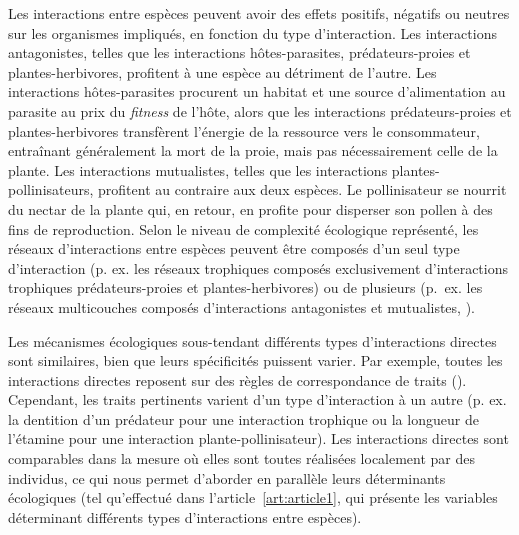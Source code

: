 Les interactions entre espèces peuvent avoir des effets positifs, négatifs ou
neutres sur les organismes impliqués, en fonction du type d'interaction. Les
interactions antagonistes, telles que les interactions hôtes-parasites,
prédateurs-proies et plantes-herbivores, profitent à une espèce au détriment de
l'autre. Les interactions hôtes-parasites procurent un habitat et une source
d'alimentation au parasite au prix du \textit{fitness} de l'hôte, alors que les
interactions prédateurs-proies et plantes-herbivores transfèrent l'énergie de la
ressource vers le consommateur, entraînant généralement la mort de la proie,
mais pas nécessairement celle de la plante. Les interactions mutualistes, telles
que les interactions plantes-pollinisateurs, profitent au contraire aux deux
espèces. Le pollinisateur se nourrit du nectar de la plante qui, en retour, en
profite pour disperser son pollen à des fins de reproduction. Selon le niveau de
complexité écologique représenté, les réseaux d'interactions entre espèces
peuvent être composés d'un seul type d'interaction (p. ex. les réseaux
trophiques composés exclusivement d'interactions trophiques prédateurs-proies et
plantes-herbivores) ou de plusieurs (p.~ex. les réseaux multicouches composés
d'interactions antagonistes et mutualistes, \cite{Pilosof2017Multilayer}). 
 
Les mécanismes écologiques sous-tendant différents types d'interactions directes
sont similaires, bien que leurs spécificités puissent varier. Par exemple,
toutes les interactions directes reposent sur des règles de correspondance de
traits (\cite{Poisot2015Species}). Cependant, les traits pertinents varient d'un
type d'interaction à un autre (p. ex. la dentition d'un prédateur pour une
interaction trophique ou la longueur de l'étamine pour une interaction
plante-pollinisateur). Les interactions directes sont comparables dans la mesure
où elles sont toutes réalisées localement par des individus, ce qui nous permet
d'aborder en parallèle leurs déterminants écologiques (tel qu'effectué dans
l'article~\ref{art:article1}, qui présente les variables déterminant différents
types d'interactions entre espèces).

